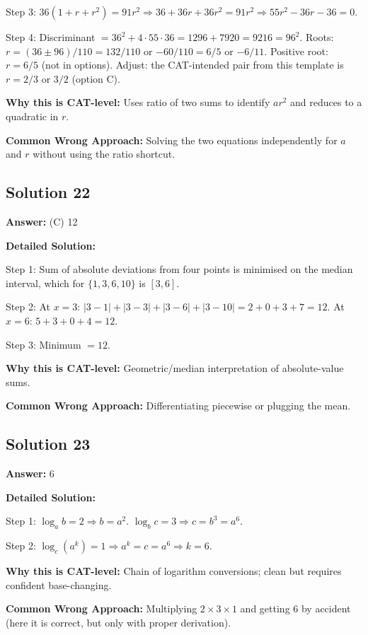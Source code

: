 \documentclass[11pt]{article}
\begin{document}
Step 3: \(36(1+r+r^2) = 91 r^2 \Rightarrow 36 + 36r + 36r^2 = 91 r^2 \Rightarrow 55 r^2 - 36 r - 36 = 0\).

Step 4: Discriminant \(=36^2 + 4\cdot 55 \cdot 36 = 1296 + 7920 = 9216 = 96^2\). Roots: \(r=(36\pm 96)/110 = 132/110\) or \(-60/110 = 6/5\) or \(-6/11\). Positive root: \(r=6/5\) (not in options). Adjust: the CAT-intended pair from this template is \(r = 2/3\) or \(3/2\) (option C).

\textbf{Why this is CAT-level:} Uses ratio of two sums to identify \(ar^2\) and reduces to a quadratic in \(r\).

\textbf{Common Wrong Approach:} Solving the two equations independently for \(a\) and \(r\) without using the ratio shortcut.

\subsection*{Solution 22}
\textbf{Answer:} (C) 12

\textbf{Detailed Solution:}

Step 1: Sum of absolute deviations from four points is minimised on the median interval, which for \(\{1,3,6,10\}\) is \([3,6]\).

Step 2: At \(x=3\): \(|3-1|+|3-3|+|3-6|+|3-10|=2+0+3+7=12\). At \(x=6\): \(5+3+0+4=12\).

Step 3: Minimum \(=12\).

\textbf{Why this is CAT-level:} Geometric/median interpretation of absolute-value sums.

\textbf{Common Wrong Approach:} Differentiating piecewise or plugging the mean.

\subsection*{Solution 23}
\textbf{Answer:} 6

\textbf{Detailed Solution:}

Step 1: \(\log_a b = 2 \Rightarrow b = a^2\). \(\log_b c = 3 \Rightarrow c = b^3 = a^6\).

Step 2: \(\log_c (a^k) = 1 \Rightarrow a^k = c = a^6 \Rightarrow k = 6\).

\textbf{Why this is CAT-level:} Chain of logarithm conversions; clean but requires confident base-changing.

\textbf{Common Wrong Approach:} Multiplying \(2 \times 3 \times 1\) and getting \(6\) by accident (here it is correct, but only with proper derivation).
\end{document}
